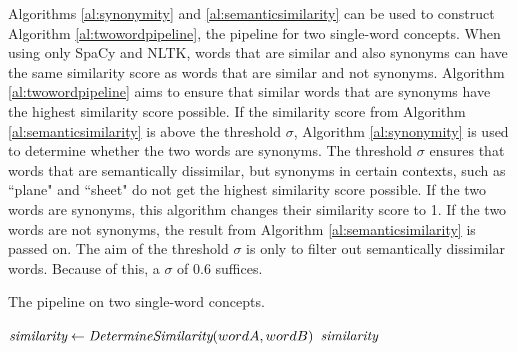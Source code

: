 \documentclass{article}
\begin{document}
Algorithms \ref{al:synonymity} and \ref{al:semanticsimilarity} can be used to construct Algorithm \ref{al:twowordpipeline}, the pipeline for two single-word concepts.  When using only SpaCy and NLTK, words that are similar and also synonyms can have the same similarity score as words that are similar and not synonyms. Algorithm \ref{al:twowordpipeline} aims to ensure that similar words that are synonyms have the highest similarity score possible. If the similarity score from Algorithm \ref{al:semanticsimilarity} is above the threshold $\sigma$, Algorithm \ref{al:synonymity} is used to determine whether the two words are synonyms. The threshold $\sigma$ ensures that words that are semantically dissimilar, but synonyms in certain contexts, such as ``plane" and ``sheet" do not get the highest similarity score possible. If the two words are synonyms, this algorithm changes their similarity score to 1. If the two words are not synonyms, the result from Algorithm \ref{al:semanticsimilarity} is passed on. The aim of the threshold $\sigma$ is only to filter out semantically dissimilar words. Because of this, a $\sigma$ of 0.6 suffices.

\begin{algorithm}
\caption{The pipeline on two single-word concepts.}\label{al:twowordpipeline}
\begin{algorithmic}[1]
		\State $\emph{similarity} \gets \emph{DetermineSimilarity}(wordA, wordB)$
				\State {}
			\EndIf
		\EndIf
		\State \Return $\emph{similarity}$
	\EndProcedure
\end{algorithmic}
\end{algorithm}


\end{document}
